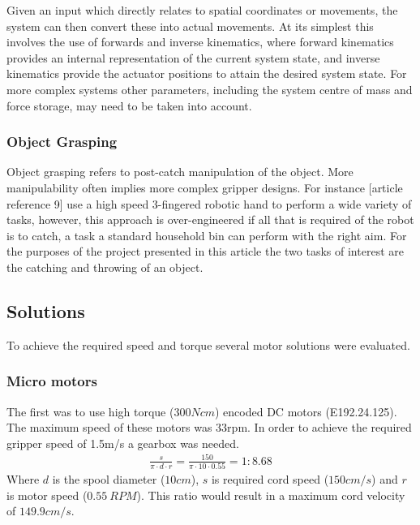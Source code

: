 \documentclass[conference]{IEEEtran}
\begin{document}
Given an input which directly relates to spatial coordinates or movements, the system can then convert these into actual movements. At its simplest this involves the use of forwards and inverse kinematics, where forward kinematics provides an internal representation of the current system state, and inverse kinematics provide the actuator positions to attain the desired system state. For more complex systems other parameters, including the system centre of mass and force storage, may need to be taken into account. 

\subsubsection{Object Grasping}
Object grasping refers to post-catch manipulation of the object. More manipulability often implies more complex gripper designs. For instance [article reference 9] use a high speed 3-fingered robotic hand to perform a wide variety of tasks, however, this approach is over-engineered if all that is required of the robot is to catch, a task a standard household bin can perform with the right aim.
For the purposes of the project presented in this article the two tasks of interest are the catching and throwing of an object.

\subsection{Solutions}
To achieve the required speed and torque several motor solutions were evaluated. 
\subsubsection{Micro motors}\label{gearbox_sol}
The first was to use high torque ($300Ncm$) encoded DC motors (E192.24.125). The maximum speed of these motors was 33rpm. In order to achieve the required gripper speed of 1.5m/s a gearbox was needed.
\begin{equation}
\begin{aligned}
\frac{s}{\pi\cdot d \cdot r} = \frac{150}{\pi\cdot 10 \cdot 0.55} = 1:8.68
\end{aligned}
\end{equation}
Where $d$ is the spool diameter ($10cm$), $s$ is required cord speed ($150cm/s$) and $r$ is motor speed ($0.55 \ RPM$). This ratio would result in a maximum cord velocity of $149.9 cm/s$.\\ 
\end{document}
